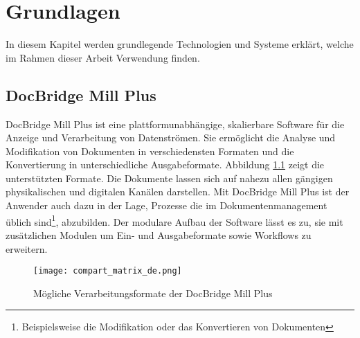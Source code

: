 
\chapter{Grundlagen}
\label{cha:Grundlagen}
In diesem Kapitel werden grundlegende Technologien und Systeme erklärt, welche im Rahmen dieser Arbeit Verwendung finden.


\section{DocBridge\textsuperscript{\textregistered} Mill Plus}{
\label{sec:MillPlus}
DocBridge\textsuperscript{\textregistered} Mill Plus ist eine plattformunabhängige, skalierbare Software für die Anzeige und Verarbeitung von Datenströmen. Sie ermöglicht die Analyse und Modifikation von Dokumenten in verschiedensten Formaten und die Konvertierung in unterschiedliche Ausgabeformate. Abbildung \ref{fig:compart_matrix} zeigt die unterstützten Formate. Die Dokumente lassen sich auf nahezu allen gängigen physikalischen und digitalen Kanälen darstellen. Mit DocBridge\textsuperscript{\textregistered} Mill Plus ist der Anwender auch dazu in der Lage, Prozesse die im Dokumentenmanagement üblich sind\footnote{Beispielsweise die Modifikation oder das Konvertieren von Dokumenten}, abzubilden. Der modulare Aufbau der Software lässt es zu, sie mit zusätzlichen Modulen um Ein- und Ausgabeformate sowie Workflows zu erweitern.

\begin{figure}[htbp] 
  \centering
     \texttt{[image: compart\_matrix\_de.png]}
  \caption{Mögliche Verarbeitungsformate der DocBridge\textsuperscript{\textregistered} Mill Plus}
  \label{fig:compart_matrix}
\end{figure}

\newpage

}

